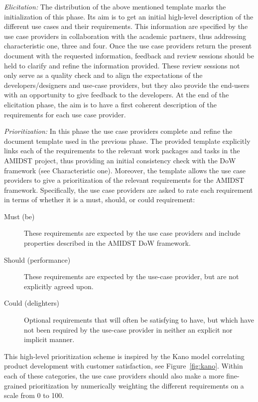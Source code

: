 \emph{Elicitation:} The distribution of the above mentioned template marks the initialization of this phase.  Its aim is
to get an initial high-level description of the different use cases and their requirements. This information are
specified by the use case providers in collaboration with the academic partners, thus addressing characteristic one,
three and four.  Once the use case providers return the present document with the requested information, feedback and
review sessions should be held to clarify and refine the information provided. These review sessions not only serve as a
quality check and to align the expectations of the developers/designers and use-case providers, but they also provide the end-users with an
opportunity to give feedback to the developers.  At the end of the elicitation phase, the
aim is to have a first coherent description of the requirements for each use case provider. 

 \emph{Prioritization:} In this phase the use case providers complete and refine  the document template used in the
 previous phase. The provided template explicitly links each of the requirements to the relevant work packages and tasks in the
 AMIDST project, thus providing an initial consistency check with the DoW framework (see Characteristic one). Moreover, the template allows the use case providers to give
 a prioritization of the relevant requirements for the AMIDST framework.  Specifically, the use case
 providers are asked to rate each requirement in terms of whether it is a must, should, or could requirement:
\begin{description}
\item[Must (be)] These requirements are expected by the use case providers and include properties described in the AMIDST DoW framework.
\item[Should (performance)] These requirements are expected by the use-case provider, but are not explicitly agreed upon.
\item[Could (delighters)] Optional requirements that will often be satisfying to have, but which have not been required
  by the use-case provider in neither an explicit nor implicit manner.
\end{description}
 This high-level prioritization scheme is inspired by the Kano model
 correlating product development with customer satisfaction, see Figure~\ref{fig:kano}. Within each of these categories, the
 use case providers should also make a more fine-grained prioritization by numerically weighting the different
 requirements on a scale from 0 to 100. 


